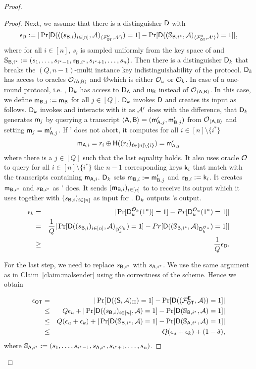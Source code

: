 \begin{proof}
\begin{proof}
Next, we assume that there is a distinguisher $\mathsf D$ with
$$
\epsilon_{\mathsf D}:=|\Pr[\mathsf D(((s_{\mathsf{B},i})_{i\in[n]},\mathcal{A})_{\langle \mathcal{F}_{\mathsf{OT}}^\mathsf{R} , \mathcal{A}' \rangle})=1] -\Pr[\mathsf D((\mathsf{\mathbb S}_{\mathsf{B},i^*}, \mathcal{A})_{\langle \mathcal{F}_{\mathsf{OT}}^\mathsf{R} , \mathcal{A}' \rangle})=1]|,
$$
where for all $i\in[n]$, $s_i$ is sampled uniformly from the key space of \UKA and $\mathsf{\mathbb S}_{\mathsf{B},i^*}:=(s_{1},\dots, s_{i^*-1},s_{\mathsf{B},i^*},s_{i^*+1},\dots, s_{n})$. Then there is a distinguisher $\mathsf D_k$ that breaks the $(Q,n-1)$-multi instance key indistinguishability of the \UKA protocol. $\mathsf D_k$ has access to oracles $\mathcal{O}_{\langle \mathsf{A},\mathsf{B}\rangle}$ and \O which is either $\mathcal{O}_u$ or $\mathcal{O}_k$. In case of a one-round protocol, i.e. , $\mathsf D_k$ has access to $\mathsf D_{\mathsf{A}}$ and $\mathsf{m}_{\mathsf{B}}$ instead of $\mathcal{O}_{\langle \mathsf{A},\mathsf{B}\rangle}$. In this case, we define $\mathsf{m}_{\mathsf{B},j}:=\mathsf{m}_{\mathsf{B}}$ for all $j\in[Q]$. $\mathsf D_k$ invokes $\mathsf D$ and creates its input as follows. $\mathsf D_k$ invokes \Adv and interacts with it as $\mathcal{A}'$ does with the difference, that $\mathsf D_k$ generates $\mathsf{m}_j$ by querying a transcript $\langle \mathsf{A}, \mathsf{B}\rangle=(\mathsf{m}_{\mathsf{A},j}',\mathsf{m}_{\mathsf{B},j}')$ from $\mathcal{O}_{\langle \mathsf{A},\mathsf{B}\rangle}$ and setting $\mathsf{m}_j=\mathsf{m}_{\mathsf{A},j}'$. If \Adv' does not abort, it computes for all $i\in[n]\setminus\{i^*\}$
$$
\mathsf{m}_{\mathsf{A},i}=r_i\oplus\mathsf{H}((r_{\ell})_{\ell\in[n]\setminus\{i\}})=\mathsf{m}_{\mathsf{A},j}'
$$
where there is a $j\in[Q]$ such that the last equality holds. It also uses oracle $\mathcal{O}$ to query for all $i\in[n]\setminus\{i^*\}$ the $n-1$ corresponding keys $\mathsf{k}_i$ that match with the transcripts containing $\mathsf{m}_{\mathsf{A},i}$. $\mathsf D_k$ sets $\mathsf{m}_{\mathsf{B},i}:=\mathsf{m}_{\mathsf{B},j}'$ and $s_{\mathsf{B},i}:=\mathsf{k}_i$. It creates $\mathsf{m}_{\mathsf{B},i^*}$ and $s_{\mathsf{B},i^*}$ as \Adv' does. It sends $(\mathsf{m}_{\mathsf{B},i})_{i\in[n]}$ to \Adv to receive its output which it uses together with $(s_{\mathsf{B},i})_{i\in[n]}$ as input for \D. $\mathsf D_k$ outputs \D's output.  
\begin{eqnarray*}
\epsilon_{k}&=&|\Pr[\mathsf D_k^{\mathcal{O}_{k}}(1^{\kappa})]=1]-Pr[\mathsf D_k^{\mathcal{O}_{u}}(1^{\kappa})=1]|\\
&= &\frac{1}{Q}|\Pr[\mathsf D((s_{\mathsf{B},i})_{i\in[n]},\mathcal{A})_{\mathsf D_k^{\mathcal{O}_{k}}})=1]-Pr[\mathsf D((\mathsf{\mathbb S}_{\mathsf{B},i^*},\mathcal{A})_{\mathsf D_k^{\mathcal{O}_{u}}})=1]|\\
&\geq&\frac{1}{Q}\epsilon_{\mathsf D}.
\end{eqnarray*}

For the last step, we need to replace $s_{\mathsf{B},i^*}$ with $s_{\mathsf{A},i^*}$. We use the same argument as in Claim~\ref{claim:malsender} using the correctness of the scheme. Hence we obtain

\begin{eqnarray*}
\epsilon_{\mathsf{OT}} &=&|\Pr[\mathsf D((\mathsf{S}, \mathcal{A})_{\Pi})=1] -\Pr[\mathsf D((\mathcal{F}_{\mathsf{OT}}^\mathsf{E},\mathcal{A}))=1]|\\
&\leq & Q\epsilon_{u}+|\Pr[\mathsf D((s_{\mathsf{B},i})_{i\in[n]},\mathcal{A})=1]-\Pr[\mathsf D(\mathsf{\mathbb S}_{\mathsf{B},i^*}, \mathcal{A})=1]|\\
&\leq & Q(\epsilon_{u}+\epsilon_{k})+|\Pr[\mathsf D(\mathsf{\mathbb S}_{\mathsf{B},i^*},\mathcal{A})=1]-\Pr[\mathsf D(\mathsf{\mathbb S}_{\mathsf{A},i^*}, \mathcal{A})=1]|\\
&\leq &Q(\epsilon_{u}+\epsilon_{k})+(1-\delta),
\end{eqnarray*}
where $\mathsf{\mathbb S}_{\mathsf{A},i^*}:=(s_{1},\dots, s_{i^*-1},s_{\mathsf{A},i^*},s_{i^*+1},\dots, s_{n})$.
\pe
\end{proof}
\pe
\end{proof}

